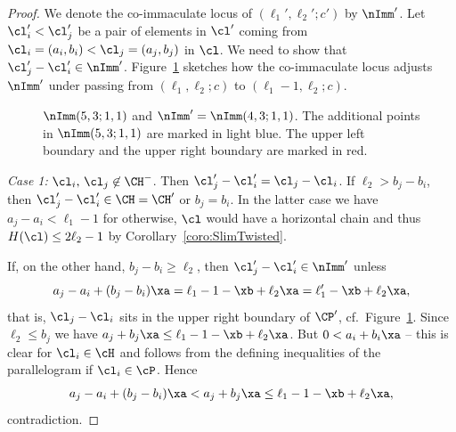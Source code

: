 \begin{proof}
We denote the {co-immaculate} locus of 
$(\ell_1',\ell_2';c')$ by $\nImm'$.
Let $\cl_i'<\cl_j'$ be a pair of elements in $\cl'$ 
coming from $\cl_i=(a_i,b_i)<\cl_j=(a_j,b_j)$ in 
$\cl$. We need to show that $\cl_j'-\cl_i'\in\nImm'$. 
Figure~\ref{fig:L1Collapse} sketches how the 
{co-immaculate} locus adjusts $\nImm'$ under passing 
from $(\ell_1,\ell_2;c)$ to $(\ell_1-1,\ell_2;c)$.

\begin{figure}[ht]
\caption{$\nImm(5,3;1,1)$ and $\nImm'=\nImm(4,3;1,1)$. 
The additional points in $\nImm(5,3;1,1)$ are marked in 
light blue. The upper left boundary and
the upper right boundary are marked in red.}
\label{fig:L1Collapse}
\end{figure}

{\em Case 1:} $\cl_i,\,\cl_j\not\in\CH^-$. Then $\cl_j'-\cl_i'=
\cl_j-\cl_i$. If $\ell_2>b_j-b_i$, then $\cl_j'-\cl_i'\in\CH=\CH'$ 
or $b_j=b_i$. In the latter case we have $a_j-a_i<\ell_1-1$ for 
otherwise, $\cl$ would have a horizontal chain and thus 
$H(\cl)\leq2\ell_2-1$ by Corollary~\ref{coro:SlimTwisted}.

If, on the other hand, $b_j-b_i\geq\ell_2$, then $\cl_j'-\cl_i'
\in\nImm'$ unless
$$
a_j-a_i+(b_j-b_i)\xa=\ell_1-1-\xb+\ell_2\xa=\ell_1'-\xb+\ell_2\xa,
$$
that is, $\cl_j-\cl_i$ sits in the upper right boundary of $\CP'$,
cf.\ Figure~\ref{fig:L1Collapse}. Since $\ell_2\leq b_j$ we have 
$a_j+b_j\xa\leq\ell_1-1-\xb+\ell_2\xa$. But $0< a_i+b_i\xa$ -- 
this is clear for $\cl_i\in\cH$ and follows from the defining 
inequalities of the parallelogram if $\cl_i\in\cP$. Hence
$$
a_j-a_i+(b_j-b_i)\xa<a_j+b_j\xa\leq\ell_1-1-\xb+\ell_2\xa,
$$
contradiction.


\end{proof}
